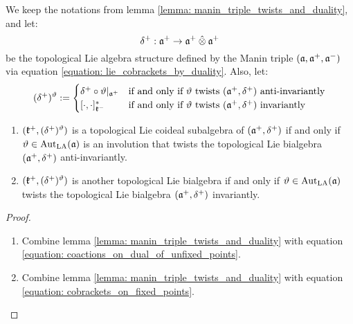         \begin{theorem} \label{theorem: twisted_lie_bialgebraic_structures}
            We keep the notations from lemma \ref{lemma: manin_triple_twists_and_duality}, and let:
                $$\delta^+: \a^+ \to \a^+ \hattensor \a^+$$
            be the topological Lie algebra structure defined by the Manin triple $(\mathfrak{a}, \mathfrak{a}^+, \mathfrak{a}^-)$ via equation \eqref{equation: lie_cobrackets_by_duality}. Also, let:
                \begin{equation} \label{equation: twisted_lie_cobrackets}
                    (\delta^+)^{\vartheta} :=
                    \begin{cases}
                        \delta^+ \circ \vartheta|_{\mathfrak{a}^+} & \text{if and only if $\vartheta$ twists $(\mathfrak{a}^+, \delta^+)$ anti-invariantly}
                        \\
                        [\cdot, \cdot]_{\mathfrak{k}^-}^* & \text{if and only if $\vartheta$ twists $(\mathfrak{a}^+, \delta^+)$ invariantly}
                    \end{cases}
                \end{equation}
            \begin{enumerate}
                \item $(\mathfrak{k}^+, (\delta^+)^{\vartheta})$ is a topological Lie coideal subalgebra of $(\mathfrak{a}^+, \delta^+)$ if and only if $\vartheta \in \operatorname{Aut}_{\mathrm{LA}}(\mathfrak{a})$ is an involution that twists the topological Lie bialgebra $(\mathfrak{a}^+, \delta^+)$ anti-invariantly.
                \item $(\mathfrak{k}^+, (\delta^+)^{\vartheta})$ is another topological Lie bialgebra if and only if $\vartheta \in \operatorname{Aut}_{\mathrm{LA}}(\mathfrak{a})$ twists the topological Lie bialgebra $(\mathfrak{a}^+, \delta^+)$ invariantly.
            \end{enumerate}
        \end{theorem}
            \begin{proof}
                \begin{enumerate}
                    \item Combine lemma \ref{lemma: manin_triple_twists_and_duality} with equation \eqref{equation: coactions_on_dual_of_unfixed_points}.
                    \item Combine lemma \ref{lemma: manin_triple_twists_and_duality} with equation \eqref{equation: cobrackets_on_fixed_points}.
                \end{enumerate}
            \end{proof}
            
